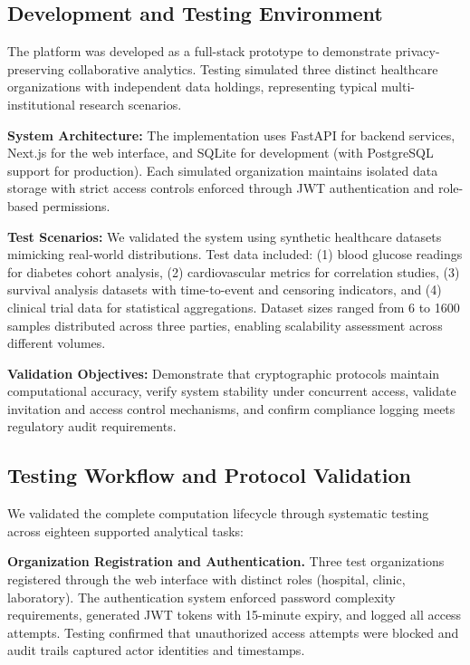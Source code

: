 \documentclass[conference]{IEEEtran}
\begin{document}
\subsection{Development and Testing Environment}
The platform was developed as a full-stack prototype to demonstrate privacy-preserving collaborative analytics. Testing simulated three distinct healthcare organizations with independent data holdings, representing typical multi-institutional research scenarios.

\textbf{System Architecture:} The implementation uses FastAPI for backend services, Next.js for the web interface, and SQLite for development (with PostgreSQL support for production). Each simulated organization maintains isolated data storage with strict access controls enforced through JWT authentication and role-based permissions.

\textbf{Test Scenarios:} We validated the system using synthetic healthcare datasets mimicking real-world distributions. Test data included: (1) blood glucose readings for diabetes cohort analysis, (2) cardiovascular metrics for correlation studies, (3) survival analysis datasets with time-to-event and censoring indicators, and (4) clinical trial data for statistical aggregations. Dataset sizes ranged from 6 to 1600 samples distributed across three parties, enabling scalability assessment across different volumes.

\textbf{Validation Objectives:} Demonstrate that cryptographic protocols maintain computational accuracy, verify system stability under concurrent access, validate invitation and access control mechanisms, and confirm compliance logging meets regulatory audit requirements.

\subsection{Testing Workflow and Protocol Validation}
We validated the complete computation lifecycle through systematic testing across eighteen supported analytical tasks:

\textbf{Organization Registration and Authentication.} Three test organizations registered through the web interface with distinct roles (hospital, clinic, laboratory). The authentication system enforced password complexity requirements, generated JWT tokens with 15-minute expiry, and logged all access attempts. Testing confirmed that unauthorized access attempts were blocked and audit trails captured actor identities and timestamps.
\end{document}
